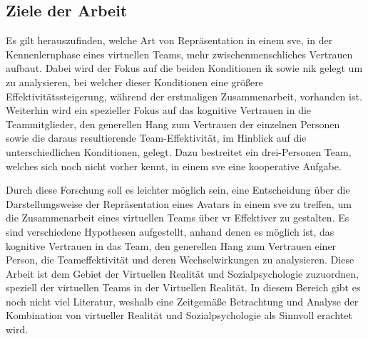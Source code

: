 \documentclass[a4paper,11pt]{article}%
\renewcommand{\\}{\vspace*{0.5\baselineskip} \newline}
\begin{document}
	\subsection{Ziele der Arbeit}
Es gilt herauszufinden, welche Art von Repräsentation in einem \ac{sve}, in der \dq{}Kennenlernphase\dq{} eines virtuellen Teams, mehr zwischenmenschliches Vertrauen aufbaut. Dabei wird der Fokus auf die beiden Konditionen \ac{ik} sowie \ac{nik} gelegt um zu analysieren, bei welcher dieser Konditionen eine größere Effektivitätssteigerung, während der erstmaligen Zusammenarbeit, vorhanden ist.
Weiterhin wird ein spezieller Fokus auf das kognitive Vertrauen in die Teammitglieder, den generellen Hang zum Vertrauen der einzelnen Personen sowie die daraus resultierende Team-Effektivität, im Hinblick auf die unterschiedlichen Konditionen, gelegt. Dazu bestreitet ein drei-Personen Team, welches sich noch nicht vorher kennt, in einem \ac{sve} eine kooperative Aufgabe.

	Durch diese Forschung soll es leichter möglich sein, eine Entscheidung über die Darstellungsweise der Repräsentation eines Avatars in einem \ac{sve} zu treffen, um die Zusammenarbeit eines virtuellen Teams über \ac{vr} Effektiver zu gestalten.
	Es sind verschiedene Hypothesen aufgestellt, anhand denen es möglich ist, das kognitive Vertrauen in das Team, den generellen Hang zum Vertrauen einer Person, die Teameffektivität und deren Wechselwirkungen zu analysieren.
	Diese Arbeit ist dem Gebiet der Virtuellen Realität und Sozialpsychologie zuzuordnen, speziell der virtuellen Teams in der Virtuellen Realität.
	In diesem Bereich gibt es noch nicht viel Literatur, weshalb eine Zeitgemäße Betrachtung und Analyse der Kombination von virtueller Realität und Sozialpsychologie als Sinnvoll erachtet wird.

\end{document}
